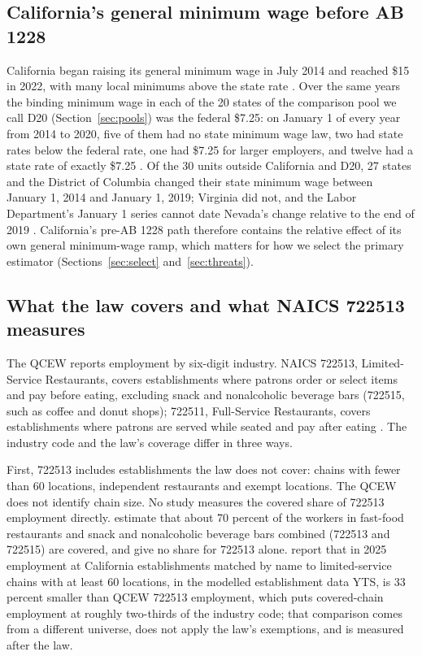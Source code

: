 \subsection{California's general minimum wage before AB 1228}
\label{sec:ramp}

California began raising its general minimum wage in July 2014 and reached \$15 in 2022, with
many local minimums above the state rate \citep{wiltshire2026minimum}. Over the same years the
binding minimum wage in each of the 20 states of the comparison pool we call D20
(Section~\ref{sec:pools}) was the federal \$7.25: on January 1 of every year from 2014 to 2020,
five of them had no state minimum wage law, two had state rates below the federal rate, one had
\$7.25 for larger employers, and twelve had a state rate of exactly \$7.25
\citep{dolwhd2025history,dolwhd2026state}. Of the 30 units outside California and D20, 27 states
and the District of Columbia changed their state minimum wage between January 1, 2014 and
January 1, 2019; Virginia did not, and the Labor Department's January 1 series cannot date
Nevada's change relative to the end of 2019 \citep{dolwhd2025history}. California's pre-AB 1228
path therefore contains the relative effect of its own general minimum-wage ramp, which matters
for how we select the primary estimator (Sections~\ref{sec:select} and~\ref{sec:threats}).

\subsection{What the law covers and what NAICS 722513 measures}
\label{sec:coverage}

The QCEW reports employment by six-digit industry. NAICS 722513, Limited-Service Restaurants,
covers establishments where patrons order or select items and pay before eating, excluding snack
and nonalcoholic beverage bars (722515, such as coffee and donut shops); 722511, Full-Service
Restaurants, covers establishments where patrons are served while seated and pay after eating
\citep{naics2022}. The industry code and the law's coverage differ in three ways.

First, 722513 includes establishments the law does not cover: chains with fewer than 60
locations, independent restaurants and exempt locations. The QCEW does not identify chain size.
No study measures the covered share of 722513 employment directly. \citet{sosinskiy2026effects}
estimate that about 70 percent of the workers in fast-food restaurants and snack and nonalcoholic
beverage bars combined (722513 and 722515) are covered, and give no share for 722513 alone.
\citet{melo2026covered} report that in 2025 employment at California establishments matched by
name to limited-service chains with at least 60 locations, in the modelled establishment data
YTS, is 33 percent smaller than QCEW 722513 employment, which puts covered-chain employment at
roughly two-thirds of the industry code; that comparison comes from a different universe, does
not apply the law's exemptions, and is measured after the law.

